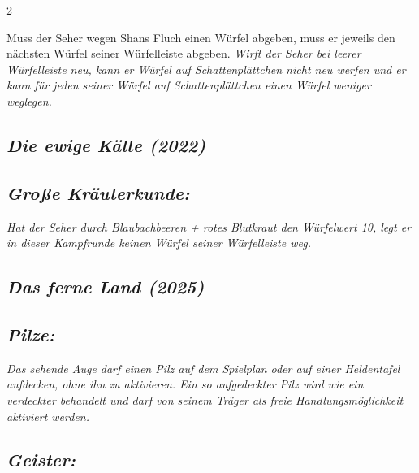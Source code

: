 \documentclass[10pt, a4paper, oneside]{book}
\newcommand{\fan}[1]{\textit{#1}}
\begin{document}
\begin{multicols*}{2}
\begin{bgcolor}[color-dz]
Muss der Seher wegen Shans Fluch einen Würfel abgeben, muss er jeweils den nächsten Würfel seiner Würfelleiste abgeben.
\supercite{dz-begleitheft}
\fan{Wirft der Seher bei leerer Würfelleiste neu, kann er Würfel auf Schattenplättchen nicht neu werfen und er kann für jeden seiner Würfel auf Schattenplättchen einen Würfel weniger weglegen.}


\end{bgcolor}




\columnbreak



\begin{bgcolor}
\section{\fan{Die ewige Kälte (2022)}}





\subsection{\fan{Große Kräuterkunde:}}

\fan{Hat der Seher durch Blaubachbeeren + rotes Blutkraut den Würfelwert 10, legt er in dieser Kampfrunde keinen Würfel seiner Würfelleiste weg.}

\end{bgcolor}




\begin{bgcolor}
\section{\fan{Das ferne Land (2025)}}

\subsection{\fan{Pilze:}}


\fan{Das sehende Auge darf einen Pilz auf dem Spielplan oder auf einer Heldentafel aufdecken, ohne ihn zu aktivieren. Ein so aufgedeckter Pilz wird wie ein verdeckter behandelt und darf von seinem Träger als freie Handlungsmöglichkeit aktiviert werden.}







\subsection{\fan{Geister:}}


\end{bgcolor}
\end{multicols*}
\end{document}
